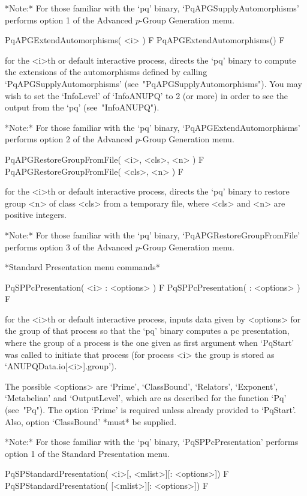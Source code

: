 *Note:*
For those  familiar  with  the  `pq'  binary,  `PqAPGSupplyAutomorphisms'
performs option 1 of the Advanced $p$-Group Generation menu.

\>PqAPGExtendAutomorphisms( <i> ) F
\>PqAPGExtendAutomorphisms() F

for the <i>th or default interactive {\ANUPQ} process, directs  the  `pq'
binary to compute the extensions of the automorphisms defined by  calling
`PqAPGSupplyAutomorphisms' (see~"PqAPGSupplyAutomorphisms"). You may wish
to set the `InfoLevel' of `InfoANUPQ' to 2 (or more) in order to see  the
output from the `pq' (see~"InfoANUPQ").

*Note:*
For  those  familiar  with  the  `pq'  binary, `PqAPGExtendAutomorphisms'
performs option 2 of the Advanced $p$-Group Generation menu.

\>PqAPGRestoreGroupFromFile( <i>, <cls>, <n> ) F
\>PqAPGRestoreGroupFromFile( <cls>, <n> ) F

for the <i>th or default interactive {\ANUPQ} process, directs  the  `pq'
binary to restore group <n> of class <cls> from a temporary  file,  where
<cls> and <n> are positive integers.

*Note:*
For those familiar  with  the  `pq'  binary,  `PqAPGRestoreGroupFromFile'
performs option 3 of the Advanced $p$-Group Generation menu.

*Standard Presentation menu commands*

\>PqSPPcPresentation( <i> : <options> ) F
\>PqSPPcPresentation( : <options> ) F

for the <i>th or default interactive {\ANUPQ} process, inputs data  given
by <options> for the group of  that  process  so  that  the  `pq'  binary
computes a pc presentation, where the group of a process is the one given
as first argument when `PqStart' was called to initiate that process (for
process <i> the group is stored as `ANUPQData.io[<i>].group').

The possible <options> are `Prime', `ClassBound', `Relators', `Exponent',
`Metabelian' and `OutputLevel', which are as described for  the  function
`Pq' (see~"Pq"). The option `Prime' is required unless  already  provided
to `PqStart'. Also, option `ClassBound' *must* be supplied.

*Note:* For those familiar with  the  `pq'  binary,  `PqSPPcPresentation'
performs option 1 of the Standard Presentation menu.

\>PqSPStandardPresentation( <i>[, <mlist>][: <options>]) F
\>PqSPStandardPresentation( [<mlist>][: <options>]) F

